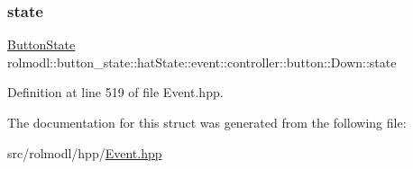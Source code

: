 \subsubsection{\texorpdfstring{state}{state}}
{\footnotesize\ttfamily \mbox{\hyperlink{namespacerolmodl_ad08ec5c56aa1db118f871357b2d475fd}{Button\+State}} rolmodl\+::button\+\_\+state\+::hat\+State\+::event\+::controller\+::button\+::\+Down\+::state}



Definition at line 519 of file Event.\+hpp.



The documentation for this struct was generated from the following file\+:\begin{DoxyCompactItemize}
\item 
src/rolmodl/hpp/\mbox{\hyperlink{_event_8hpp}{Event.\+hpp}}\end{DoxyCompactItemize}
